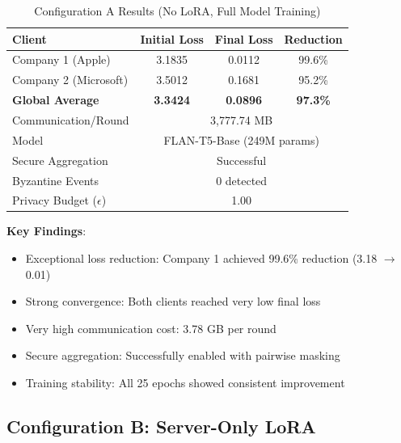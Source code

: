 \documentclass[conference]{IEEEtran}
\begin{document}
\begin{table}[h]
\centering
\caption{Configuration A Results (No LoRA, Full Model Training)}
\label{tab:config_a}
\begin{tabular}{@{}lccc@{}}
\toprule
\textbf{Client} & \textbf{Initial Loss} & \textbf{Final Loss} & \textbf{Reduction} \\
\midrule
Company 1 (Apple) & 3.1835 & 0.0112 & 99.6\% \\
Company 2 (Microsoft) & 3.5012 & 0.1681 & 95.2\% \\
\midrule
\textbf{Global Average} & \textbf{3.3424} & \textbf{0.0896} & \textbf{97.3\%} \\
\midrule
Communication/Round & \multicolumn{3}{c}{3,777.74 MB} \\
Model & \multicolumn{3}{c}{FLAN-T5-Base (249M params)} \\
Secure Aggregation & \multicolumn{3}{c}{Successful} \\
Byzantine Events & \multicolumn{3}{c}{0 detected} \\
Privacy Budget ($\epsilon$) & \multicolumn{3}{c}{1.00} \\
\bottomrule
\end{tabular}
\end{table}

\textbf{Key Findings}:
\begin{itemize}
    \item Exceptional loss reduction: Company 1 achieved 99.6\% reduction (3.18 $\rightarrow$ 0.01)
    \item Strong convergence: Both clients reached very low final loss
    \item Very high communication cost: 3.78 GB per round
    \item Secure aggregation: Successfully enabled with pairwise masking
    \item Training stability: All 25 epochs showed consistent improvement
\end{itemize}

\subsection{Configuration B: Server-Only LoRA}
\end{document}
